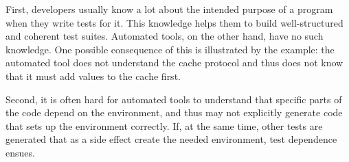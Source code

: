 First, developers usually know a lot about the intended purpose of a
program when they write tests for it. This knowledge helps them to
build well-structured and coherent test suites.
Automated tools, on the other hand, have no such knowledge. One
possible consequence of this is illustrated by the example: the
automated tool does not understand the cache protocol and thus does
not know that it must add values to the cache first. 



Second, it is often hard for automated tools to understand that
specific parts of the code depend on the environment, and thus may not
explicitly generate code that sets up the environment correctly. If,
at the same time, other tests are generated that as a side effect
create the needed environment, test dependence ensues.



